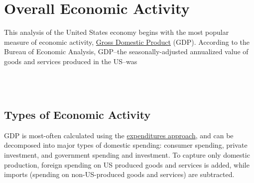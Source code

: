 \documentclass{report}
\begin{document}
\section*{\color{darkgray} \LARGE Overall Economic Activity}
\label{sec:oea}
\begin{minipage}{0.61\textwidth}
\small This analysis of the United States economy begins with the most popular measure of economic activity, \href{https://www.bea.gov/data/gdp/gross-domestic-product}{Gross Domestic Product} (GDP). According to the Bureau of Economic Analysis, GDP--the seasonally-adjusted annualized value of goods and services produced in the US--was \\

\\
\end{minipage}\hfill
\begin{minipage}{0.34\textwidth}
\\
\end{minipage}

\begin{minipage}{0.76\textwidth}
\subsection*{\color{black!70}\seriffont Types of Economic Activity}

\small GDP is most-often calculated using the \href{https://www.bea.gov/help/glossary/expenditures-approach}{expenditures approach}, and can be decomposed into major types of domestic spending: consumer spending, private investment, and government spending and investment. To capture only domestic production, foreign spending on US produced goods and services is added, while imports (spending on non-US-produced goods and services) are subtracted.\\
\end{minipage}
\end{document}

